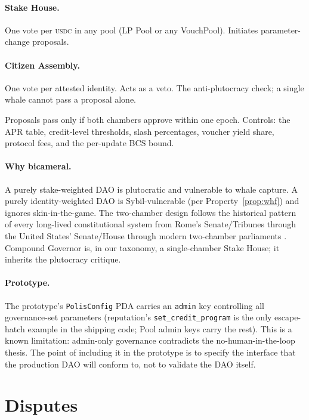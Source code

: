 \documentclass[10pt,conference,letterpaper]{IEEEtran}
\theoremstyle{definition}
\newcommand{\USDC}{\textsc{usdc}}
\begin{document}
\paragraph{Stake House.} One vote per \USDC{} in any pool (LP Pool or
any VouchPool). Initiates parameter-change proposals.

\paragraph{Citizen Assembly.} One vote per attested identity. Acts as
a veto. The anti-plutocracy check; a single whale cannot pass a
proposal alone.

Proposals pass only if both chambers approve within one epoch.
Controls: the APR table, credit-level thresholds, slash percentages,
voucher yield share, protocol fees, and the per-update BCS bound.

\paragraph{Why bicameral.} A purely stake-weighted DAO is plutocratic
and vulnerable to whale capture. A purely identity-weighted DAO is
Sybil-vulnerable (per Property~\ref{prop:whf}) and ignores
skin-in-the-game. The two-chamber design follows the historical
pattern of every long-lived constitutional system from Rome's
Senate/Tribunes through the United States' Senate/House through
modern two-chamber parliaments \cite{hansen1999athenian}. Compound
Governor \cite{compoundgovernance2020} is, in our taxonomy, a
single-chamber Stake House; it inherits the plutocracy critique.

\paragraph{Prototype.} The prototype's \texttt{PolisConfig} PDA carries
an \texttt{admin} key controlling all governance-set parameters
(reputation's \texttt{set\_credit\_program} is the only escape-hatch
example in the shipping code; Pool admin keys carry the rest). This is
a known limitation: admin-only governance contradicts the
no-human-in-the-loop thesis. The point of including it in the
prototype is to specify the interface that the production DAO will
conform to, not to validate the DAO itself.

\section{Disputes}\label{sec:disputes}
\end{document}
